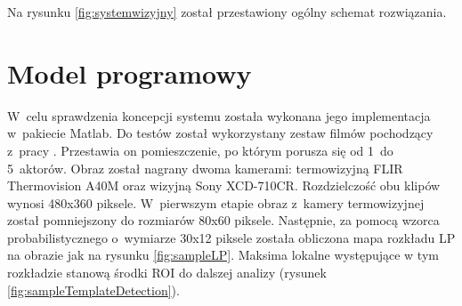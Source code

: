 Na rysunku \ref{fig:systemwizyjny} został przestawiony ogólny schemat rozwiązania.

\section{Model programowy}

W~celu sprawdzenia koncepcji systemu została wykonana jego implementacja w~pakiecie Matlab. 
Do testów został wykorzystany zestaw filmów pochodzący z~pracy \cite{bilodeau2014thermal}. 
Przestawia on pomieszczenie, po którym porusza się od 1~do 5~aktorów. 
Obraz został nagrany dwoma kamerami: termowizyjną FLIR Thermovision A40M oraz wizyjną Sony XCD-710CR. 
Rozdzielczość obu klipów wynosi 480x360 piksele. 
W~pierwszym etapie obraz z~kamery termowizyjnej został pomniejszony do rozmiarów 80x60 piksele. 
Następnie, za pomocą wzorca probabilistycznego o~wymiarze 30x12 piksele została obliczona mapa rozkładu LP na obrazie jak na rysunku \ref{fig:sampleLP}. %
Maksima lokalne występujące w tym rozkładzie stanową środki ROI do dalszej analizy (rysunek \ref{fig:sampleTemplateDetection}).
